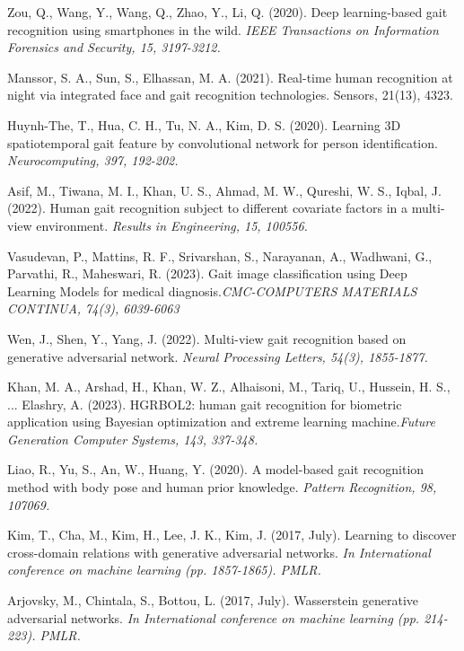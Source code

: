 \documentclass[12pt,a4paper]{article}
\begin{document}
\begin{thebibliography}{99}
  

 Zou, Q., Wang, Y., Wang, Q., Zhao, Y., Li, Q. (2020). Deep learning-based gait recognition using smartphones in the wild. {\em IEEE Transactions on Information Forensics and Security, 15, 3197-3212.}


Manssor, S. A., Sun, S., Elhassan, M. A. (2021). Real-time human recognition at night via integrated face and gait recognition technologies. Sensors, 21(13), 4323.

Huynh-The, T., Hua, C. H., Tu, N. A., Kim, D. S. (2020). Learning 3D spatiotemporal gait feature by convolutional network for person identification. {\em Neurocomputing, 397, 192-202.}

Asif, M., Tiwana, M. I., Khan, U. S., Ahmad, M. W., Qureshi, W. S., Iqbal, J. (2022). Human gait recognition subject to different covariate factors in a multi-view environment. {\em Results in Engineering, 15, 100556.}

 Vasudevan, P., Mattins, R. F., Srivarshan, S., Narayanan, A., Wadhwani, G., Parvathi, R., Maheswari, R. (2023). Gait image classification using Deep Learning Models for medical diagnosis.{\em CMC-COMPUTERS MATERIALS CONTINUA, 74(3), 6039-6063}

Wen, J., Shen, Y., Yang, J. (2022). Multi-view gait recognition based on generative adversarial network. {\em Neural Processing Letters, 54(3), 1855-1877.}

Khan, M. A., Arshad, H., Khan, W. Z., Alhaisoni, M., Tariq, U., Hussein, H. S., ... Elashry, A. (2023). HGRBOL2: human gait recognition for biometric application using Bayesian optimization and extreme learning machine.{\em Future Generation Computer Systems, 143, 337-348.}

Liao, R., Yu, S., An, W., Huang, Y. (2020). A model-based gait recognition method with body pose and human prior knowledge. {\em Pattern Recognition, 98, 107069.}

Kim, T., Cha, M., Kim, H., Lee, J. K., Kim, J. (2017, July). Learning to discover cross-domain relations with generative adversarial networks. {\em In International conference on machine learning (pp. 1857-1865). PMLR.}

 Arjovsky, M., Chintala, S., Bottou, L. (2017, July). Wasserstein generative adversarial networks. {\em In International conference on machine learning (pp. 214-223). PMLR.}


\end{thebibliography}
\end{document}
